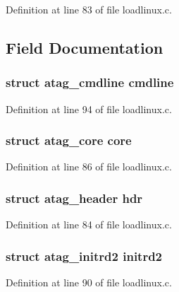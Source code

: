 \-Definition at line 83 of file loadlinux.\-c.



\subsection{\-Field \-Documentation}
\hypertarget{structatag_a967131921bcaf65942ba3c162ca9b216}{
\subsubsection[{cmdline}]{\setlength{\rightskip}{0pt plus 5cm}struct {\bf atag\-\_\-cmdline} {\bf cmdline}}}\label{structatag_a967131921bcaf65942ba3c162ca9b216}


\-Definition at line 94 of file loadlinux.\-c.

\hypertarget{structatag_a3e5111a292381fc207b3a8641ec6768b}{
\subsubsection[{core}]{\setlength{\rightskip}{0pt plus 5cm}struct {\bf atag\-\_\-core} {\bf core}}}\label{structatag_a3e5111a292381fc207b3a8641ec6768b}


\-Definition at line 86 of file loadlinux.\-c.

\hypertarget{structatag_a66c7c965cacca4dc92877044e8dfe41b}{
\subsubsection[{hdr}]{\setlength{\rightskip}{0pt plus 5cm}struct {\bf atag\-\_\-header} {\bf hdr}}}\label{structatag_a66c7c965cacca4dc92877044e8dfe41b}


\-Definition at line 84 of file loadlinux.\-c.

\hypertarget{structatag_a0b791b85cd154b77c27383a8fe75d6e9}{
\subsubsection[{initrd2}]{\setlength{\rightskip}{0pt plus 5cm}struct {\bf atag\-\_\-initrd2} {\bf initrd2}}}\label{structatag_a0b791b85cd154b77c27383a8fe75d6e9}


\-Definition at line 90 of file loadlinux.\-c.

